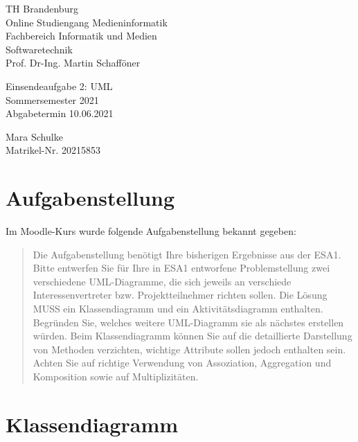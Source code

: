 \documentclass{article}
\begin{document}
\begin{titlepage}
	\begin{flushleft}
		TH Brandenburg \\
		Online Studiengang Medieninformatik \\
		Fachbereich Informatik und Medien \\
		Softwaretechnik \\
		Prof. Dr-Ing. Martin Schafföner
	\end{flushleft}

	\vfill

	\begin{center}
		\Large{Einsendeaufgabe 2: UML}\\[0.5em]
		\large{Sommersemester 2021}\\[0.25em]
		\large{Abgabetermin 10.06.2021}
	\end{center}

	\vfill

	\begin{flushright}
		Mara Schulke \\
		Matrikel-Nr. 20215853
	\end{flushright}
\end{titlepage}

\tableofcontents

\vfill

\section{Aufgabenstellung}

Im Moodle-Kurs wurde folgende Aufgabenstellung bekannt gegeben:

\begin{quote}
	Die Aufgabenstellung benötigt Ihre bisherigen Ergebnisse aus der ESA1.
	Bitte entwerfen Sie für Ihre in ESA1 entworfene Problemstellung zwei
	verschiedene UML-Diagramme, die sich jeweils an verschiede
	Interessenvertreter bzw. Projektteilnehmer richten sollen. Die Lösung MUSS
	ein Klassendiagramm und ein Aktivitätsdiagramm enthalten. Begründen Sie,
	welches weitere UML-Diagramm sie als nächstes erstellen würden. Beim
	Klassendiagramm können Sie auf die detaillierte Darstellung von Methoden
	verzichten, wichtige Attribute sollen jedoch enthalten sein. Achten Sie auf
	richtige Verwendung von Assoziation, Aggregation und Komposition sowie auf
	Multiplizitäten.
\end{quote}

\newpage

\section{Klassendiagramm}
\end{document}
